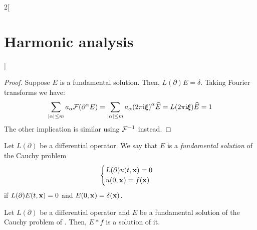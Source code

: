 \documentclass[../../../main_math.tex]{subfiles}
\begin{document}
\begin{multicols}{2}[\section{Harmonic analysis}]
\begin{theorem}
  \end{theorem}
  \begin{proof}
    Suppose $E$ is a fundamental solution. Then, $L(\partial)E=\delta$. Taking Fourier transforms we have:
    $$
      \sum_{\abs{\alpha}\leq m}a_\alpha\mathcal{F}{(\partial^\alpha E)}=\sum_{\abs{\alpha}\leq m}a_\alpha{(2\pi\mathrm{i}\boldsymbol{\mathrm{\xi}})}^\alpha\widehat{E}=L(2\pi\mathrm{i}\boldsymbol{\mathrm{\xi}})\widehat{E}=1
    $$
    The other implication is similar using $\mathcal{F}^{-1}$ instead.
  \end{proof}
  \begin{definition}
    Let $L(\partial)$ be a differential operator. We say that $E$ is a \emph{fundamental solution} of the Cauchy problem
    \begin{equation}\label{HA:cauchy}
      \begin{cases}
        L(\partial)u(t,\boldsymbol{\mathrm{x}})=0 \\
        u(0,\boldsymbol{\mathrm{x}})= f(\boldsymbol{\mathrm{x}})
      \end{cases}
    \end{equation}
    if $L(\partial)E(t,\boldsymbol{\mathrm{x}})=0$ and $E(0,\boldsymbol{\mathrm{x}})=\delta(\boldsymbol{\mathrm{x}})$.
  \end{definition}
  \begin{theorem}
    Let $L(\partial)$ be a differential operator and $E$ be a fundamental solution of the Cauchy problem of . Then, $E*f$ is a solution of it.
  \end{theorem}

\end{multicols}
\end{document}
